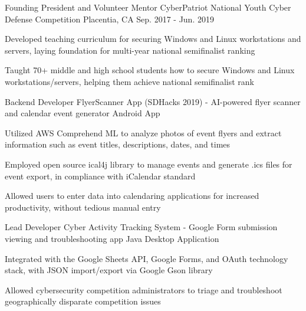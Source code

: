 \begin{cventries}
  \cventry
    {Founding President and Volunteer Mentor} %
    {CyberPatriot National Youth Cyber Defense Competition} %
    {Placentia, CA} %
    {Sep. 2017 - Jun. 2019} %
    {
      \begin{cvitems} %
        \item {Developed teaching curriculum for securing Windows and Linux workstations and servers, laying foundation for multi-year national semifinalist ranking}
        \item {Taught 70+ middle and high school students how to secure Windows and Linux workstations/servers, helping them achieve national semifinalist rank}
      \end{cvitems}
    }

\cventry
{Backend Developer} %
{FlyerScanner App (SDHacks 2019) - AI-powered flyer scanner and calendar event generator} %
{Android App} %
{} %
{
  \begin{cvitems} %
    \item {Utilized AWS Comprehend ML to analyze photos of event flyers and extract information such as event titles, descriptions, dates, and times}
    \item {Employed open source ical4j library to manage events and generate .ics files for event export, in compliance with iCalendar standard}
    \item {Allowed users to enter data into calendaring applications for increased productivity, without tedious manual entry}
  \end{cvitems}
}

\cventry
{Lead Developer} %
{Cyber Activity Tracking System - Google Form submission viewing and troubleshooting app} %
{Java Desktop Application} %
{} %
{
  \begin{cvitems} %
    \item {Integrated with the Google Sheets API, Google Forms, and OAuth technology stack, with JSON import/export via Google Gson library}
    \item {Allowed cybersecurity competition administrators to triage and troubleshoot geographically disparate competition issues}
  \end{cvitems}
}

\end{cventries}

